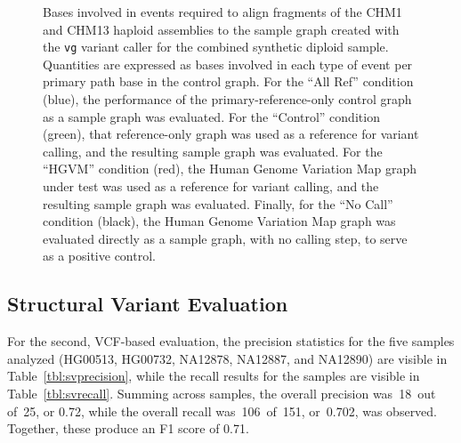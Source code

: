 \begin{figure}[p]
\caption[Mole realignment evaluation]{Bases involved in events required to align fragments of the CHM1 and CHM13 haploid assemblies to the sample graph created with the \texttt{vg} variant caller for the combined synthetic diploid sample. Quantities are expressed as bases involved in each type of event per primary path base in the control graph. For the ``All Ref'' condition (blue), the performance of the primary-reference-only control graph as a sample graph was evaluated. For the ``Control'' condition (green), that reference-only graph was used as a reference for variant calling, and the resulting sample graph was evaluated. For the ``HGVM'' condition (red), the Human Genome Variation Map graph under test was used as a reference for variant calling, and the resulting sample graph was evaluated. Finally, for the ``No Call'' condition (black), the Human Genome Variation Map graph was evaluated directly as a sample graph, with no calling step, to serve as a positive control.}
\label{fig:molerealignment}
\end{figure}

\subsection{Structural Variant Evaluation}

For the second, VCF-based evaluation, the precision statistics for the five samples analyzed (HG00513, HG00732, NA12878, NA12887, and NA12890) are visible in Table~\ref{tbl:svprecision}, while the recall results for the samples are visible in Table~\ref{tbl:svrecall}.
Summing across samples, the overall precision was~18~out of~25, or 0.72, while the overall recall was~106~of~151, or~0.702, was observed. Together, these produce an F1 score of 0.71.

\newcommand{\true}{\textbullet}
\newcommand{\false}{}

